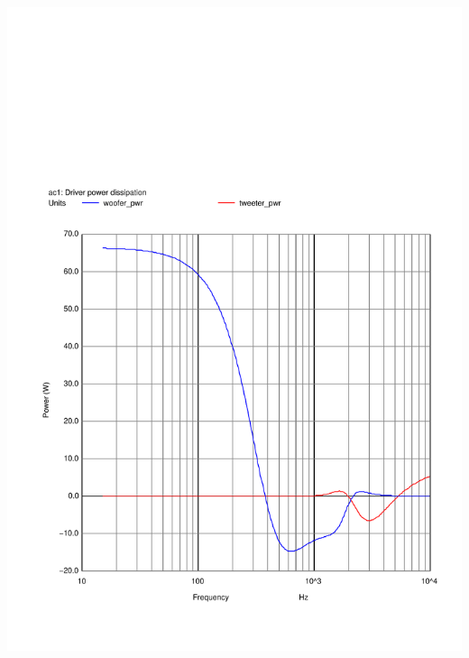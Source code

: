 \documentclass[10pt]{article}
\begin{document}
\begin{multicols}{2}
	\includegraphics[scale=0.35,page=1]{../crossover/ngspice/spk_pwr.pdf}

\end{multicols}
\end{document}
